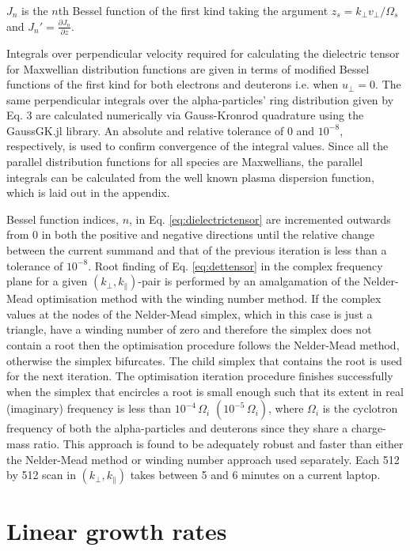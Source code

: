 \documentclass[12pt]{iopart}
\begin{document}
\noindent $J_n$ is the $n$th Bessel function of the first kind taking the
argument $z_s=k_\perp v_\perp / \Omega_s$ and $J_n'=\frac{\partial J_n}{\partial z}$.

Integrals over perpendicular velocity required for calculating the
dielectric tensor for Maxwellian distribution functions are given in terms of
modified Bessel functions of the first kind \cite{Stix} for both electrons and
deuterons i.e. when $u_\perp =0$. The same perpendicular integrals over the
alpha-particles' ring distribution given by Eq. 3 are calculated numerically via
Gauss-Kronrod \cite{Kronrod1965} quadrature using the GaussGK.jl \cite{QuadGK}
library. An absolute and relative tolerance of $0$ and $10^{-8}$, respectively,
is used to confirm convergence of the integral values.
Since all the parallel distribution functions for all species are Maxwellians,
the parallel integrals can be calculated from the well known plasma dispersion
function\cite{Fried1961}, which is laid out in the appendix.

Bessel function indices, $n$, in Eq. \ref{eq:dielectrictensor} are incremented
outwards from 0 in both the positive and negative directions
until the relative change between the current summand and that of the
previous iteration is less than a tolerance of $10^{-8}$. 
Root finding of Eq. \ref{eq:dettensor} in the complex frequency plane
for a given $(k_\bot, k_\parallel)$-pair is performed by an amalgamation of the
Nelder-Mead \cite{Nelder1965} optimisation method with the winding number method.
If the complex values at the nodes of the Nelder-Mead simplex, which in this
case is just a triangle, have a winding number
of zero and therefore the simplex does not contain a root then the optimisation
procedure follows the Nelder-Mead method, otherwise the simplex bifurcates.
The child simplex that contains the root is used for the next
iteration. The optimisation iteration procedure finishes successfully when
the simplex that encircles a root is small enough such that its extent in real
(imaginary) frequency is less than $10^{-4}\, \Omega_i$ $(10^{-5}\, \Omega_i)$,
where $\Omega_i$ is the cyclotron frequency of both
the alpha-particles and deuterons since they share a charge-mass ratio.
This approach is found to be adequately robust and
faster than either the Nelder-Mead method or winding number approach used
separately. Each 512 by 512 scan in $(k_\perp, k_\parallel)$ takes between 5
and 6 minutes on a current laptop.

\section{Linear growth rates}
\end{document}

